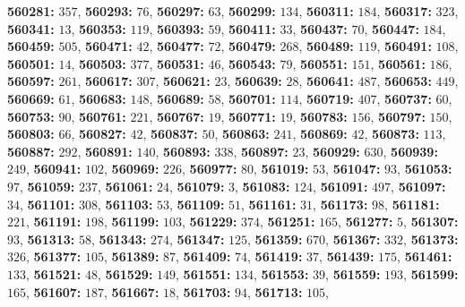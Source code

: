 \textsf{\bfseries 560281:} $357$, \textsf{\bfseries 560293:} $76$, \textsf{\bfseries 560297:} $63$, \textsf{\bfseries 560299:} $134$, \textsf{\bfseries 560311:} $184$, \textsf{\bfseries 560317:} $323$, \textsf{\bfseries 560341:} $13$, \textsf{\bfseries 560353:} $119$, \textsf{\bfseries 560393:} $59$, \textsf{\bfseries 560411:} $33$, \textsf{\bfseries 560437:} $70$, \textsf{\bfseries 560447:} $184$, \textsf{\bfseries 560459:} $505$, \textsf{\bfseries 560471:} $42$, \textsf{\bfseries 560477:} $72$, \textsf{\bfseries 560479:} $268$, \textsf{\bfseries 560489:} $119$, \textsf{\bfseries 560491:} $108$, \textsf{\bfseries 560501:} $14$, \textsf{\bfseries 560503:} $377$, \textsf{\bfseries 560531:} $46$, \textsf{\bfseries 560543:} $79$, \textsf{\bfseries 560551:} $151$, \textsf{\bfseries 560561:} $186$, \textsf{\bfseries 560597:} $261$, \textsf{\bfseries 560617:} $307$, \textsf{\bfseries 560621:} $23$, \textsf{\bfseries 560639:} $28$, \textsf{\bfseries 560641:} $487$, \textsf{\bfseries 560653:} $449$, \textsf{\bfseries 560669:} $61$, \textsf{\bfseries 560683:} $148$, \textsf{\bfseries 560689:} $58$, \textsf{\bfseries 560701:} $114$, \textsf{\bfseries 560719:} $407$, \textsf{\bfseries 560737:} $60$, \textsf{\bfseries 560753:} $90$, \textsf{\bfseries 560761:} $221$, \textsf{\bfseries 560767:} $19$, \textsf{\bfseries 560771:} $19$, \textsf{\bfseries 560783:} $156$, \textsf{\bfseries 560797:} $150$, \textsf{\bfseries 560803:} $66$, \textsf{\bfseries 560827:} $42$, \textsf{\bfseries 560837:} $50$, \textsf{\bfseries 560863:} $241$, \textsf{\bfseries 560869:} $42$, \textsf{\bfseries 560873:} $113$, \textsf{\bfseries 560887:} $292$, \textsf{\bfseries 560891:} $140$, \textsf{\bfseries 560893:} $338$, \textsf{\bfseries 560897:} $23$, \textsf{\bfseries 560929:} $630$, \textsf{\bfseries 560939:} $249$, \textsf{\bfseries 560941:} $102$, \textsf{\bfseries 560969:} $226$, \textsf{\bfseries 560977:} $80$, \textsf{\bfseries 561019:} $53$, \textsf{\bfseries 561047:} $93$, \textsf{\bfseries 561053:} $97$, \textsf{\bfseries 561059:} $237$, \textsf{\bfseries 561061:} $24$, \textsf{\bfseries 561079:} $3$, \textsf{\bfseries 561083:} $124$, \textsf{\bfseries 561091:} $497$, \textsf{\bfseries 561097:} $34$, \textsf{\bfseries 561101:} $308$, \textsf{\bfseries 561103:} $53$, \textsf{\bfseries 561109:} $51$, \textsf{\bfseries 561161:} $31$, \textsf{\bfseries 561173:} $98$, \textsf{\bfseries 561181:} $221$, \textsf{\bfseries 561191:} $198$, \textsf{\bfseries 561199:} $103$, \textsf{\bfseries 561229:} $374$, \textsf{\bfseries 561251:} $165$, \textsf{\bfseries 561277:} $5$, \textsf{\bfseries 561307:} $93$, \textsf{\bfseries 561313:} $58$, \textsf{\bfseries 561343:} $274$, \textsf{\bfseries 561347:} $125$, \textsf{\bfseries 561359:} $670$, \textsf{\bfseries 561367:} $332$, \textsf{\bfseries 561373:} $326$, \textsf{\bfseries 561377:} $105$, \textsf{\bfseries 561389:} $87$, \textsf{\bfseries 561409:} $74$, \textsf{\bfseries 561419:} $37$, \textsf{\bfseries 561439:} $175$, \textsf{\bfseries 561461:} $133$, \textsf{\bfseries 561521:} $48$, \textsf{\bfseries 561529:} $149$, \textsf{\bfseries 561551:} $134$, \textsf{\bfseries 561553:} $39$, \textsf{\bfseries 561559:} $193$, \textsf{\bfseries 561599:} $165$, \textsf{\bfseries 561607:} $187$, \textsf{\bfseries 561667:} $18$, \textsf{\bfseries 561703:} $94$, \textsf{\bfseries 561713:} $105$, 
